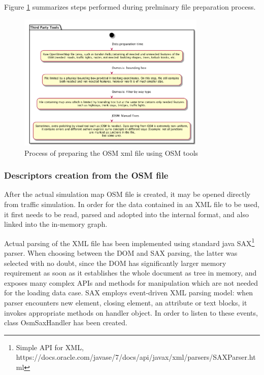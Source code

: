 Figure \ref{fig:thirdPartyToolsOSMPreparation} summarizes steps performed during prelminary file preparation process.
\begin{figure}[h]
    \caption{Process of preparing the OSM xml file using OSM tools}
    \label{fig:thirdPartyToolsOSMPreparation}
    \centering
    \includegraphics[width=0.8\textwidth]{../../uml_diagrams/thirdPartyToolsDataLoading.png}
\end{figure}


\subsubsection{Descriptors creation from the OSM file}
After the actual simulation map OSM file is created, it may be opened directly from traffic simulation. In order for the data contained in an XML file to be used, it first needs to be read, parsed and adopted into the internal format, and also linked into the in-memory graph.

Actual parsing of the XML file has been implemented using standard java SAX\footnote{Simple API for XML, https://docs.oracle.com/javase/7/docs/api/javax/xml/parsers/SAXParser.html} parser. When choosing between the DOM and SAX parsing, the latter was selected with no doubt, since the DOM has significantly larger memory requirement as soon as it establishes the whole document as tree in memory, and exposes many complex APIs and methods for manipulation which are not needed for the loading data case. SAX employs event-driven XML parsing model: when parser encounters new element, closing element, an attribute or text blocks, it invokes appropriate methods on handler object. In order to listen to these events, class OsmSaxHandler has been created.

